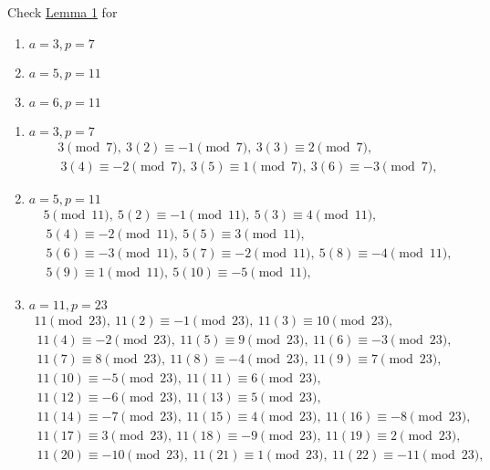 \documentclass[handout]{ximera}
\begin{document}
\begin{br}
	Check \hyperref[lem:residues-gauss-lem]{Lemma 1} for 
	\begin{enumerate}
		\item $a=3, p=7$
		\item $a=5, p=11$
		\item $a=6, p=11$
	\end{enumerate}
    \begin{solution}
		\begin{enumerate}

		\item $a=3, p=7$ 
			\begin{align*}
				3\pmod{7},
				\ 3(2)\equiv -1\pmod{7},
				\ 3(3)\equiv 2\pmod{7},\\
				\ 3(4)\equiv -2\pmod{7},
				\ 3(5)\equiv 1\pmod{7},
				\ 3(6)\equiv -3\pmod{7},
			\end{align*}
		\item $a=5, p=11$
			\begin{align*}
				5\pmod{11},
				\ 5(2)\equiv -1\pmod{11},
				\ 5(3)\equiv 4\pmod{11},\\
				\ 5(4)\equiv -2\pmod{11},
				\ 5(5)\equiv 3\pmod{11},\\
				\ 5(6)\equiv -3\pmod{11},
				\ 5(7)\equiv -2\pmod{11},
				\ 5(8)\equiv -4\pmod{11},\\
				\ 5(9)\equiv 1\pmod{11},
				\ 5(10)\equiv -5\pmod{11},
			\end{align*}
		\item $a=11, p=23$
			\begin{align*}
				11\pmod{23},
				\ 11(2)\equiv -1\pmod{23},
				\ 11(3)\equiv 10\pmod{23},\\
				\ 11(4)\equiv -2\pmod{23},
				\ 11(5)\equiv 9\pmod{23},
				\ 11(6)\equiv -3\pmod{23},\\
				\ 11(7)\equiv 8\pmod{23},
				\ 11(8)\equiv -4\pmod{23},
				\ 11(9)\equiv 7\pmod{23},\\
				\ 11(10)\equiv -5\pmod{23},
				\ 11(11)\equiv 6\pmod{23},\\
				\ 11(12)\equiv -6\pmod{23},
				\ 11(13)\equiv 5\pmod{23},\\
				\ 11(14)\equiv -7\pmod{23},
				\ 11(15)\equiv 4\pmod{23},
				\ 11(16)\equiv -8\pmod{23},\\
				\ 11(17)\equiv 3\pmod{23},
				\ 11(18)\equiv -9\pmod{23},
				\ 11(19)\equiv 2\pmod{23},\\
				\ 11(20)\equiv -10\pmod{23},
				\ 11(21)\equiv 1\pmod{23},
				\ 11(22)\equiv -11\pmod{23},
			\end{align*}
		\end{enumerate}
	\end{solution}
\end{br}
\end{document}
